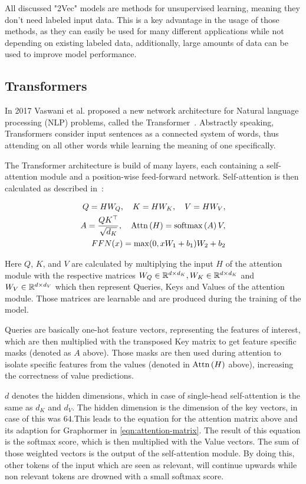 All discussed "2Vec" models are methods for unsupervised learning, meaning they don't need labeled input data. This is a key advantage in the usage of those methods, as they can easily be used for many different applications while not depending on existing labeled data, additionally, large amounts of data can be used to improve model performance.

\subsection{Transformers}
In 2017 Vaswani et al. proposed a new network architecture for Natural language processing (NLP) problems, called the Transformer~\cite{vaswani2017attention}. Abstractly speaking, Transformers consider input sentences as a connected system of words, thus attending on all other words while learning the meaning of one specifically.

The Transformer architecture is build of many layers, each containing a self-attention module and a position-wise feed-forward network. Self-attention is then calculated as described in~\cite{2021graphormer}:

\begin{align}
    Q = HW_Q,\quad K = HW_K,\quad V = HW_V,\label{eqn:attention-alpha} \\
    A = \frac{QK^\top}{\sqrt{d_K}}, \quad \mathrm{Attn}\left(H\right) = \mathrm{softmax}\left(A\right)V,     \\
    FFN(x) = \max(0,xW_1 + b_1)W_2 + b_2
    \label{eqn:attention-alpha2}
\end{align}

Here $Q$, $K$, and $V$ are calculated by multiplying the input $H$ of the attention module with the respective matrices $W_Q\in\mathbb{R}^{d\times d_K}, W_K\in\mathbb{R}^{d\times d_K}$ and $ W_V\in\mathbb{R}^{d\times d_V}$ which then represent Queries, Keys and Values of the attention module. Those matrices are learnable and are produced during the training of the model.

Queries are basically one-hot feature vectors, representing the features of interest, which are then multiplied with the transposed Key matrix to get feature specific masks (denoted as $A$ above). Those masks are then used during attention to isolate specific features from the values (denoted in $\mathrm{Attn}\left(H\right)$ above), increasing the correctness of value predictions.

$d$ denotes the hidden dimensions, which in case of single-head self-attention is the same as $d_K$ and $d_V$. The hidden dimension is the dimension of the key vectors, in case of \cite{vaswani2017attention} this was $64$.This leads to the equation for the attention matrix above and its adaption for Graphormer in \autoref{eqn:attention-matrix}. The result of this equation is the softmax score, which is then multiplied with the Value vectors. The sum of those weighted vectors is the output of the self-attention module. By doing this, other tokens of the input which are seen as relevant, will continue upwards while non relevant tokens are drowned with a small softmax score.

